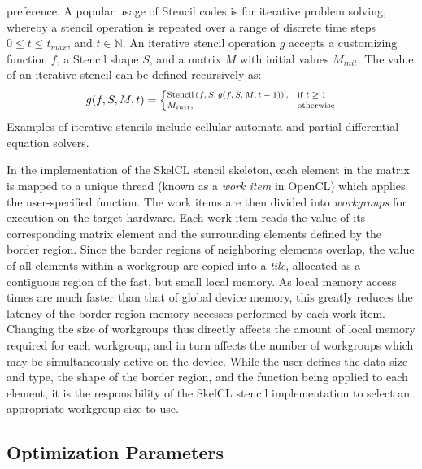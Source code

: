   preference. A popular usage of Stencil codes is for iterative problem
  solving, whereby a stencil operation is repeated over a range of
  discrete time steps $0 \le t \le t_{max}$, and $t \in \mathbb{N}$. An
  iterative stencil operation $g$ accepts a customizing function $f$, a
  Stencil shape $S$, and a matrix $M$ with initial values
  $M_{init}$. The value of an iterative stencil can be defined
  recursively as:
  \begin{equation}
    \scriptsize
    g(f, S, M, t) =
    \begin{cases}
      \stencil \left( f, S, g(f, S, M, t-1) \right),& \text{if } t \geq 1\\
      M_{init}, & \text{otherwise}
    \end{cases}
  \end{equation}
  Examples of iterative stencils include cellular automata and partial
  differential equation solvers.

  In the implementation of the SkelCL stencil skeleton, each element in
  the matrix is mapped to a unique thread (known as a \emph{work item}
  in OpenCL) which applies the user-specified function. The work items
  are then divided into \emph{workgroups} for execution on the target
  hardware. Each work-item reads the value of its corresponding matrix
  element and the surrounding elements defined by the border
  region. Since the border regions of neighboring elements overlap, the
  value of all elements within a workgroup are copied into a
  \emph{tile}, allocated as a contiguous region of the fast, but small
  local memory. As local memory access times are much faster than that
  of global device memory, this greatly reduces the latency of the
  border region memory accesses performed by each work item. Changing
  the size of workgroups thus directly affects the amount of local memory
  required for each workgroup, and in turn affects the number of
  workgroups which may be simultaneously active on the device. While the
  user defines the data size and type, the shape of the border region,
  and the function being applied to each element, it is the
  responsibility of the SkelCL stencil implementation to select an
  appropriate workgroup size to use.


  \subsection{Optimization Parameters}\label{subsec:op-params}

